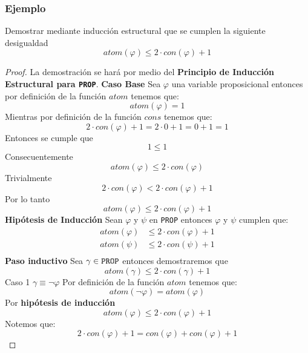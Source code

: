 \documentclass[a4paper]{article}
\begin{document}
\subsubsection{Ejemplo}
\noindent
Demostrar mediante inducción estructural que se cumplen la siguiente desigualdad
\[
    atom\left(\varphi\right)  \leq 2 \cdot con\left(\varphi\right) + 1
\]
\begin{proof}
    La demostración se hará por medio del \textbf{Principio de Inducción Estructural para \texttt{PROP}}.
    \newline
    \textbf{Caso Base}
    \newline
    Sea \(\varphi\) una variable proposicional entonces por definición de la función \(atom\) tenemos que:
    \[
        atom\left(\varphi\right) = 1
    \]
    Mientras por definición de la función \(cons\) tenemos que:
    \[
        2 \cdot con\left(\varphi\right) + 1 = 2 \cdot 0 + 1 = 0 + 1 = 1
    \]
    Entonces se cumple que
    \[
        1 \leq 1  
    \]
    Consecuentemente
    \[
        atom\left(\varphi\right) \leq  2 \cdot con\left(\varphi\right) 
    \]
    Trivialmente
    \[
        2 \cdot con\left(\varphi\right) < 2 \cdot con\left(\varphi\right) + 1
    \]
    Por lo tanto 
    \[
        atom\left(\varphi\right)  \leq 2 \cdot con\left(\varphi\right) + 1
    \]
    \textbf{Hipótesis de Inducción}
    \newline 
    Sean \(\varphi\) y \(\psi\) en \texttt{PROP} entonces \(\varphi\) y \(\psi\) cumplen que:
    \begin{align*}
        atom\left(\varphi\right)  &\leq 2 \cdot con\left(\varphi\right) + 1 \\
        atom\left(\psi\right)  &\leq 2 \cdot con\left(\psi\right) + 1 \\
    \end{align*}
    \textbf{Paso inductivo}
    \newline 
    Sea \(\gamma \in \text{\texttt{PROP}}\) entonces demostraremos que 
    \[
        atom\left(\gamma\right)  \leq 2 \cdot con\left(\gamma\right) + 1  
    \]
    Caso 1
    \newline 
    \(\gamma \equiv \neg \varphi\)
    \newline 
    Por definición de la función \(atom\) tenemos que:
    \[
        atom\left(\neg \varphi\right) = atom\left(\varphi\right)
    \]
    Por \textbf{hipótesis de inducción}
    \[
        atom\left(\varphi\right) \leq 2 \cdot con\left(\varphi\right) + 1
    \]
    Notemos que:
    \[
        2 \cdot con\left(\varphi\right) + 1 = con\left(\varphi\right) + con\left(\varphi\right) + 1
\]
\end{proof}
\end{document}
